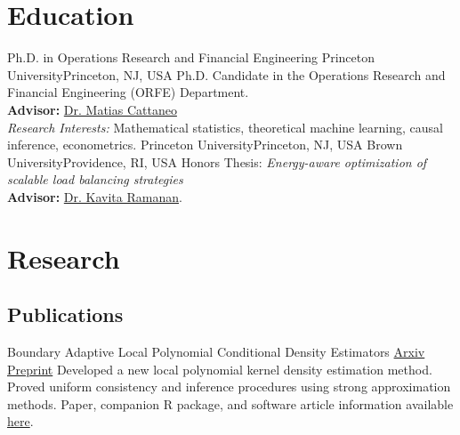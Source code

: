 \documentclass[10pt,a4paper,roman]{moderncv}        %
\begin{document}
\makecvtitle

\section{Education}
{Ph.D. in Operations Research and Financial Engineering}
{Princeton University}{Princeton, NJ, USA}{}
{Ph.D. Candidate in the Operations Research and Financial Engineering (ORFE) Department.\\
\textbf{Advisor: }\color{blue}\href{https://cattaneo.princeton.edu}{Dr. Matias Cattaneo}\color{black}\\
\textit{Research Interests:} Mathematical statistics, theoretical machine learning, causal inference, econometrics.}
{Princeton University}{Princeton, NJ, USA}{}{}
{Brown University}{Providence, RI, USA}{}{ Honors Thesis: \textit{Energy-aware optimization of scalable load balancing
    strategies}
  \\
  \textbf{Advisor: }
  \color{blue}\href{https://www.brown.edu/academics/applied-mathematics/faculty/kavita-ramanan/home}
  {Dr. Kavita Ramanan}\color{black}.}  %

\section{Research}
\subsection{Publications}
{Boundary Adaptive Local Polynomial Conditional Density Estimators}
{\color{blue}\href{https://arxiv.org/abs/2204.10359}{Arxiv Preprint}\color{black}}{}
{Developed a new local polynomial kernel density estimation method.
  Proved uniform consistency and inference procedures using strong approximation
  methods.
  Paper, companion R package, and software article information available
  \color{blue}\href{https://rajitachandak.github.io/research/}{here}.}
\end{document}
